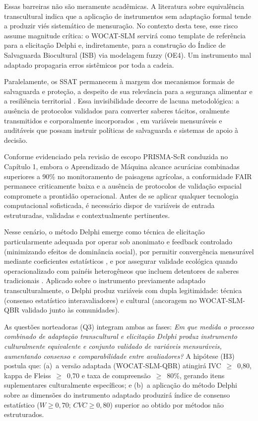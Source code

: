 Essas barreiras não são meramente acadêmicas. A literatura sobre equivalência transcultural \cite{Herdman1999,Guillemin1993} indica que a aplicação de instrumentos sem adaptação formal tende a produzir viés sistemático de mensuração. No contexto desta tese, esse risco assume magnitude crítica: o WOCAT-SLM servirá como template de referência para a elicitação Delphi e, indiretamente, para a construção do Índice de Salvaguarda Biocultural (ISB) via modelagem fuzzy (OE4). Um instrumento mal adaptado propagaria erros sistêmicos por toda a cadeia.

Paralelamente, os SSAT permanecem à margem dos mecanismos formais de salvaguarda e proteção, a despeito de sua relevância para a segurança alimentar e a resiliência territorial \cite{Altieri1995,Toledo2008}. Essa invisibilidade decorre de lacuna metodológica: a ausência de protocolos validados para converter saberes tácitos, oralmente transmitidos e corporalmente incorporados \cite{Polanyi1966}, em variáveis mensuráveis e auditáveis que possam instruir políticas de salvaguarda e sistemas de apoio à decisão.

Conforme evidenciado pela revisão de escopo PRISMA-ScR conduzida no Capítulo 1, embora o Aprendizado de Máquina alcance acurácias combinadas superiores a 90\% no monitoramento de paisagens agrícolas, a conformidade FAIR permanece criticamente baixa e a ausência de protocolos de validação espacial compromete a prontidão operacional. Antes de se aplicar qualquer tecnologia computacional sofisticada, é necessário dispor de variáveis de entrada estruturadas, validadas e contextualmente pertinentes.

Nesse cenário, o método Delphi \cite{Linstone1975,Rowe1999} emerge como técnica de elicitação particularmente adequada por operar sob anonimato e feedback controlado (minimizando efeitos de dominância social), por permitir convergência mensurável mediante coeficientes estatísticos \cite{Diamond2014}, e por assegurar validade ecológica quando operacionalizado com painéis heterogêneos que incluem detentores de saberes tradicionais \cite{Santos2007}. Aplicado sobre o instrumento previamente adaptado transculturalmente, o Delphi produz variáveis com dupla legitimidade: técnica (consenso estatístico interavaliadores) e cultural (ancoragem no WOCAT-SLM-QBR validado junto às comunidades).

As questões norteadoras (Q3) integram ambas as fases: \textit{Em que medida o processo combinado de adaptação transcultural e elicitação Delphi produz instrumento culturalmente equivalente e conjunto validado de variáveis mensuráveis, aumentando consenso e comparabilidade entre avaliadores?} A hipótese (H3) postula que: (a)~a versão adaptada (WOCAT-SLM-QBR) atingirá IVC~$\geq$~0,80, kappa de Fleiss~$\geq$~0,70 e taxa de compreensão~$\geq$~80\%, gerando itens suplementares culturalmente específicos; e (b)~a aplicação do método Delphi sobre as dimensões do instrumento adaptado produzirá índice de consenso estatístico ($W \geq 0,70$; $CVC \geq 0,80$) superior ao obtido por métodos não estruturados.

